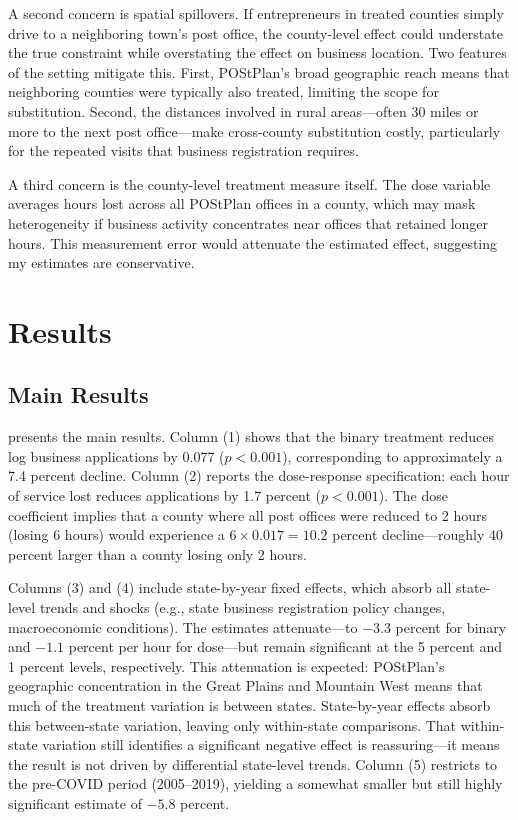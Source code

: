 \documentclass[12pt]{article}
\begin{document}
A second concern is spatial spillovers. If entrepreneurs in treated counties simply drive to a neighboring town's post office, the county-level effect could understate the true constraint while overstating the effect on business location. Two features of the setting mitigate this. First, POStPlan's broad geographic reach means that neighboring counties were typically also treated, limiting the scope for substitution. Second, the distances involved in rural areas---often 30 miles or more to the next post office---make cross-county substitution costly, particularly for the repeated visits that business registration requires.

A third concern is the county-level treatment measure itself. The dose variable averages hours lost across all POStPlan offices in a county, which may mask heterogeneity if business activity concentrates near offices that retained longer hours. This measurement error would attenuate the estimated effect, suggesting my estimates are conservative.

\section{Results}

\subsection{Main Results}



 presents the main results. Column (1) shows that the binary treatment reduces log business applications by 0.077 ($p < 0.001$), corresponding to approximately a 7.4 percent decline. Column (2) reports the dose-response specification: each hour of service lost reduces applications by 1.7 percent ($p < 0.001$). The dose coefficient implies that a county where all post offices were reduced to 2 hours (losing 6 hours) would experience a $6 \times 0.017 = 10.2$ percent decline---roughly 40 percent larger than a county losing only 2 hours.

Columns (3) and (4) include state-by-year fixed effects, which absorb all state-level trends and shocks (e.g., state business registration policy changes, macroeconomic conditions). The estimates attenuate---to $-3.3$ percent for binary and $-1.1$ percent per hour for dose---but remain significant at the 5 percent and 1 percent levels, respectively. This attenuation is expected: POStPlan's geographic concentration in the Great Plains and Mountain West means that much of the treatment variation is between states. State-by-year effects absorb this between-state variation, leaving only within-state comparisons. That within-state variation still identifies a significant negative effect is reassuring---it means the result is not driven by differential state-level trends. Column (5) restricts to the pre-COVID period (2005--2019), yielding a somewhat smaller but still highly significant estimate of $-5.8$ percent.
\end{document}
